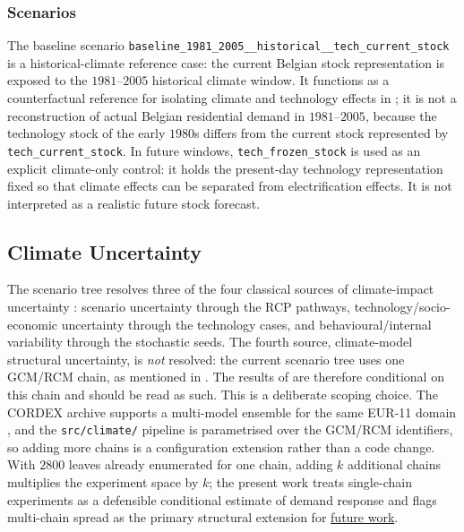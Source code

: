 \subsubsection*{Scenarios}
The baseline scenario \texttt{baseline\_1981\_2005\_\_historical\_\_tech\_current\_stock} is a historical-climate reference case: the current Belgian stock representation is exposed to the $1981$--$2005$ historical climate window. It functions as a counterfactual reference for isolating climate and technology effects in ; it is not a reconstruction of actual Belgian residential demand in $1981$--$2005$, because the technology stock of the early $1980$s differs from the current stock represented by \texttt{tech\_current\_stock}. In future windows, \texttt{tech\_frozen\_stock} is used as an explicit climate-only control: it holds the present-day technology representation fixed so that climate effects can be separated from electrification effects. It is not interpreted as a realistic future stock forecast.


\subsection{Climate Uncertainty}
\label{sec:climateUncertainty}

The scenario tree resolves three of the four classical sources of climate-impact uncertainty \cite{Hawkins2009UncertaintyPartitioning}: scenario uncertainty through the RCP pathways, technology/socio-economic uncertainty through the technology cases, and behavioural/internal variability through the stochastic seeds. The fourth source, climate-model structural uncertainty, is \emph{not} resolved: the current scenario tree uses one GCM/RCM chain, as mentioned in . The results of  are therefore conditional on this chain and should be read as such. This is a deliberate scoping choice. The CORDEX archive supports a multi-model ensemble for the same EUR-11 domain \cite{Jacob2014EuroCordex}, and the \texttt{src/climate/} pipeline is parametrised over the GCM/RCM identifiers, so adding more chains is a configuration extension rather than a code change. With $2800$ leaves already enumerated for one chain, adding $k$ additional chains multiplies the experiment space by $k$; the present work treats single-chain experiments as a defensible conditional estimate of demand response and flags multi-chain spread as the primary structural extension for \hyperref[sec:futurework]{future work}.

